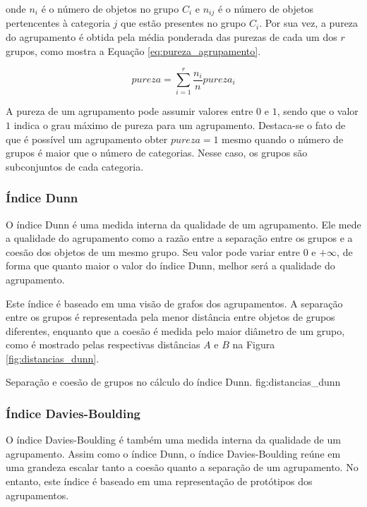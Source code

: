 \noindent onde $n_i$ é o número de objetos no grupo $C_i$ e $n_{ij}$ é o número
de objetos pertencentes à categoria $j$ que estão presentes no grupo $C_i$. Por
sua vez, a pureza do agrupamento é obtida pela média ponderada das purezas de 
cada um dos $r$ grupos, como mostra a Equação \ref{eq:pureza_agrupamento}.

\begin{equation}
	pureza = \sum_{i=1}^{r}{\frac{n_i}{n} pureza_i}
	\label{eq:pureza_agrupamento}
\end{equation}

A pureza de um agrupamento pode assumir valores entre $0$ e $1$, sendo que o
valor $1$ indica o grau máximo de pureza para um agrupamento. Destaca-se o fato
de que é possível um agrupamento obter $pureza = 1$ mesmo quando o número de 
grupos é maior que o número de categorias. Nesse caso, os grupos são
subconjuntos de cada categoria.

\subsubsection{Índice Dunn}
	\label{subsubsec:indice_dunn}
	
O índice Dunn é uma medida interna da qualidade de um agrupamento. Ele mede a 
qualidade do agrupamento como a razão entre a separação entre os grupos e a
coesão dos objetos de um mesmo grupo. Seu valor pode variar entre $0$ e
$+\infty$, de forma que quanto maior o valor do índice Dunn, melhor será a
qualidade do agrupamento.

Este índice é baseado em uma visão de grafos dos agrupamentos. A separação entre
os grupos é representada pela menor distância entre objetos de grupos
diferentes, enquanto que a coesão é medida pelo maior diâmetro de um grupo, como
é mostrado pelas respectivas distâncias $A$ e $B$ na Figura
\ref{fig:distancias_dunn}.

{Separação e coesão de grupos no cálculo do índice Dunn.}
{fig:distancias_dunn}

\subsubsection{Índice Davies-Boulding}
	\label{subsubsec:indice_davies_boulding}
	
O índice Davies-Boulding é também uma medida interna da qualidade de um
agrupamento. Assim como o índice Dunn, o índice Davies-Boulding reúne em uma
grandeza escalar tanto a coesão quanto a separação de um agrupamento. No
entanto, este índice é baseado em uma representação de protótipos dos
agrupamentos.

